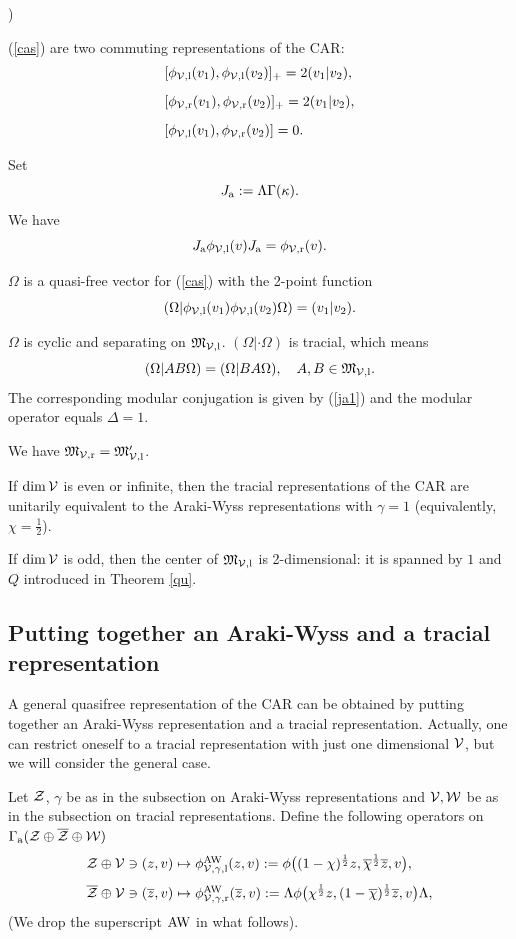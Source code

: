 \documentclass{svmult}
\newcounter{smallarabics}
\newenvironment{arabicenumerate}
{\begin{list}{{\normalfont\textrm{\arabic{smallarabics})}}}
  {\usecounter{smallarabics}\setlength{\itemindent}{0cm}
   \setlength{\leftmargin}{5ex}\setlength{\labelwidth}{4ex}
   \setlength{\topsep}{0.75\parsep}\setlength{\partopsep}{0ex}
   \setlength{\itemsep}{0ex}}}
{\end{list}}
\newcommand{\ben}{\begin{arabicenumerate}}
\newcommand{\een}{\end{arabicenumerate}}
\newcommand{\beq}{\begin{equation}}
\newcommand{\eeq}{\end{equation}}
\def\bet{\begin{theorem}}
\def\eet{\end{theorem}}
\def\AW{{\rm AW}}
\def\bar{\overline}
\def\l{{\rm l}}
\def\r{{\rm r}}
\def\12{{\frac12}}
\def\AW{{\rm AW}}
\def\cZ{{\cal Z}}
\def\cV{{\cal V}}
\def\cW{{\cal W}}
\def\fM{{\mathfrak M}}
\def\a{{\rm a}}
\def\12{\frac{1}{2}}
\def\l{{\rm l}}
\def\r{{\rm r}}
\def\12{\frac{1}{2}}
\begin{document}
\bet\ben\item (\ref{cas}) are two commuting representations of the CAR:
\[\begin{array}{l}
[\phi_{\cV,\l}(v_1),\phi_{\cV,\l}(v_2)]_+=2(v_1|v_2),\\[3mm]
[\phi_{\cV,\r}(v_1),\phi_{\cV,\r}(v_2)]_+=2(v_1|v_2),\\[3mm]
[\phi_{\cV,\l}(v_1),\phi_{\cV,\r}(v_2)]=0.
\end{array}\]
\item Set 
\beq J_\a:= \Lambda\Gamma(\kappa).\label{ja1}\eeq
We have
\[J_\a\phi_{\cV,\l}(v)J_\a=\phi_{\cV,\r}(v).\]
\item $\Omega$ is a quasi-free vector for  (\ref{cas}) 
with the 2-point function
\[(\Omega|\phi_{\cV,\l}(v_1)\phi_{\cV,\l}(v_2)\Omega)=(v_1|v_2).\]
\item
 $\Omega$ is cyclic
 and separating  on $\fM_{\cV,\l}$.
$(\Omega|\cdot\Omega)$ is  tracial, which means
\[(\Omega|AB\Omega)=(\Omega|BA\Omega),\ \ \ A,B\in\fM_{\cV,\l}.\]
The 
corresponding modular conjugation is given by (\ref{ja1}) 
and the modular operator equals $\Delta=1$.
\item We have
 $\fM_{\cV,\r}=\fM_{\cV,\l}'$.
\item If $\dim\cV$ is even or infinite, then
  the  tracial representations of the CAR are unitarily equivalent to
  the Araki-Wyss representations with $\gamma=1$ (equivalently,
  $\chi=\frac12$). 
\item If $\dim\cV$ is odd, then the center of  $\fM_{\cV,\l}$
is 2-dimensional: it is spanned by $1$ and $Q$ introduced in  Theorem \ref{qu}.
\een\label{trac}\eet


\subsection{Putting together an Araki-Wyss and a tracial representation}

A general quasifree representation of the CAR can be obtained by 
putting together an Araki-Wyss representation and a tracial representation.
Actually, one can restrict oneself to a tracial representation
with just one dimensional $\cV$, but we will consider the general case.



 Let $\cZ$, $\gamma$ 
be as in the subsection on Araki-Wyss representations and $\cV,\cW$ be as
in the subsection on tracial representations.
Define the following operators on $\Gamma_\a(\cZ\oplus\bar\cZ\oplus\cW)$
\beq\begin{array}{l}
 \cZ\oplus\cV\ni (z,v)\mapsto
\phi_{\cV,\gamma,\l}^\AW
(z,v):=\phi\bigl((1-\chi)^{\12}z,\bar\chi^{\12}\bar z,v\bigr)
,\\[3mm]
\bar \cZ\oplus\cV\ni (\bar z,v)\mapsto
 \phi_{\cV,\gamma,\r}^\AW(\bar z,v):=\Lambda
\phi\bigl(\chi^{\12}z,
(1-\bar\chi)^{\12}\bar z,v\bigr)\Lambda
,\end{array}\label{cas1}\eeq
(We drop the superscript $\rm AW$ in what follows).
\end{document}

